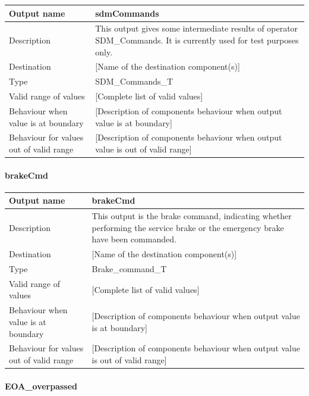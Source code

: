 \begin{longtable}{p{}p{}}
\toprule
Output name				& sdmCommands \\
\midrule
Description				& This output gives some intermediate results of operator SDM\_Commands. It is currently used for test purposes only. \\
\midrule
Destination				& [Name of the destination component(s)] \\ 
\midrule
Type					& SDM\_Commands\_T \\
\midrule
Valid range of values	& [Complete list of valid values] \\
\midrule
Behaviour when value is at boundary	& [Description of components behaviour when output value is at boundary] \\
\midrule
Behaviour for values out of valid range	& [Description of components behaviour when output value is out of valid range] \\
\bottomrule
\end{longtable}

\paragraph{brakeCmd}

\begin{longtable}{p{}p{}}
\toprule
Output name				& brakeCmd \\
\midrule
Description				& This output is the brake command, indicating whether performing the service brake or the emergency brake have been commanded. \\
\midrule
Destination				& [Name of the destination component(s)] \\ 
\midrule
Type					& Brake\_command\_T \\
\midrule
Valid range of values	& [Complete list of valid values] \\
\midrule
Behaviour when value is at boundary	& [Description of components behaviour when output value is at boundary] \\
\midrule
Behaviour for values out of valid range	& [Description of components behaviour when output value is out of valid range] \\
\bottomrule
\end{longtable}


\paragraph{EOA\_overpassed}

